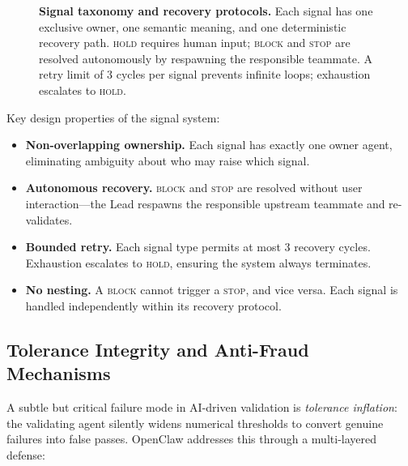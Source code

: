 \begin{figure}[!t]
\begin{tikzpicture}
\end{tikzpicture}
\caption{%
  \textbf{Signal taxonomy and recovery protocols.}
  Each signal has one exclusive owner, one semantic meaning, and one
  deterministic recovery path. \textsc{hold} requires human input;
  \textsc{block} and \textsc{stop} are resolved autonomously by
  respawning the responsible teammate. A retry limit of 3 cycles
  per signal prevents infinite loops; exhaustion escalates to
  \textsc{hold}.
}
\label{fig:signals}
\end{figure}

Key design properties of the signal system:

\begin{itemize}[leftmargin=*,itemsep=2pt]
  \item \textbf{Non-overlapping ownership.} Each signal has exactly
    one owner agent, eliminating ambiguity about who may raise which
    signal.
  \item \textbf{Autonomous recovery.} \textsc{block} and
    \textsc{stop} are resolved without user interaction---the Lead
    respawns the responsible upstream teammate and re-validates.
  \item \textbf{Bounded retry.} Each signal type permits at most 3
    recovery cycles. Exhaustion escalates to \textsc{hold}, ensuring
    the system always terminates.
  \item \textbf{No nesting.} A \textsc{block} cannot trigger a
    \textsc{stop}, and vice versa. Each signal is handled
    independently within its recovery protocol.
\end{itemize}


\subsection{Tolerance Integrity and Anti-Fraud Mechanisms}
\label{sec:tolerance}

A subtle but critical failure mode in AI-driven validation is
\emph{tolerance inflation}: the validating agent silently widens
numerical thresholds to convert genuine failures into false passes.
OpenClaw addresses this through a multi-layered defense:

